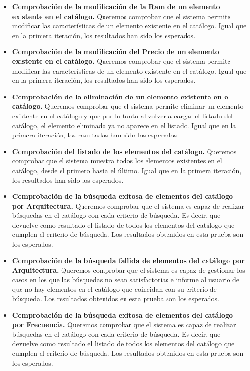 \begin{itemize}
\begin{itemize}
	\item \textbf{Comprobación de la modificación de la Ram de un elemento existente en el catálogo.} Queremos comprobar que el sistema permite modificar las características de un elemento existente en el catálogo. Igual que en la primera iteración, los resultados han sido los esperados.	
	\item \textbf{Comprobación de la modificación del Precio de un elemento existente en el catálogo.} Queremos comprobar que el sistema permite modificar las características de un elemento existente en el catálogo. Igual que en la primera iteración, los resultados han sido los esperados.
	\item \textbf{Comprobación de la eliminación de un elemento existente en el catálogo.} Queremos comprobar que el sistema permite eliminar un elemento existente en el catálogo y que por lo tanto al volver a cargar el listado del catálogo, el elemento eliminado ya no aparece en el listado. Igual que en la primera iteración, los resultados han sido los esperados.
	\item \textbf{Comprobación del listado de los elementos del catálogo.} Queremos comprobar que el sistema muestra todos los elementos existentes en el catálogo, desde el primero hasta el último. Igual que en la primera iteración, los resultados han sido los esperados.
	\item \textbf{Comprobación de la búsqueda exitosa de elementos del catálogo por Arquitectura.} Queremos comprobar que el sistema es capaz de realizar búsquedas en el catálogo con cada criterio de búsqueda. Es decir, que devuelve como resultado el listado de todos los elementos del catálogo que cumplen el criterio de búsqueda. Los resultados obtenidos en esta prueba son los esperados.
	\item \textbf{Comprobación de la búsqueda fallida de elementos del catálogo por Arquitectura.} Queremos comprobar que el sistema es capaz de gestionar los casos en los que las búsquedas no sean satisfactorias e informe al usuario de que no hay elementos en el catálogo que coincidan con su criterio de búsqueda. Los resultados obtenidos en esta prueba son los esperados.
	\item \textbf{Comprobación de la búsqueda exitosa de elementos del catálogo por Frecuencia.} Queremos comprobar que el sistema es capaz de realizar búsquedas en el catálogo con cada criterio de búsqueda. Es decir, que devuelve como resultado el listado de todos los elementos del catálogo que cumplen el criterio de búsqueda. Los resultados obtenidos en esta prueba son los esperados.

\end{itemize}
\end{itemize}
